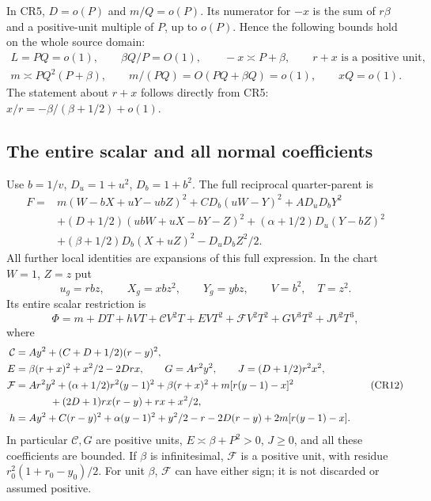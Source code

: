 In CR5, $D=o(P)$ and $m/Q=o(P)$. Its numerator for $-x$ is
the sum of $r\beta$ and a positive-unit multiple of $P$, up to
$o(P)$. Hence the following bounds hold on the whole source domain:
\[
\begin{gathered}
 L=PQ=o(1),\qquad \beta Q/P=O(1),\qquad
 -x\asymp P+\beta,\qquad r+x\text{ is a positive unit},\\
 m\asymp PQ^2(P+\beta),\qquad
 m/(PQ)=O(PQ+\beta Q)=o(1),\qquad xQ=o(1).
\end{gathered}\tag{CR8}
\]
The statement about $r+x$ follows directly from CR5:
$x/r=-\beta/(\beta+1/2)+o(1)$.

\subsection{The entire scalar and all normal coefficients}

Use $b=1/v$, $D_u=1+u^2$, $D_b=1+b^2$. The full reciprocal
quarter-parent is
\[
\begin{aligned}
 F={}&m(W-bX+uY-ubZ)^2+CD_b(uW-Y)^2+AD_uD_bY^2\\
 &+(D+1/2)(ubW+uX-bY-Z)^2
 +(\alpha+1/2)D_u(Y-bZ)^2\\
 &+(\beta+1/2)D_b(X+uZ)^2-D_uD_bZ^2/2.
\end{aligned}\tag{CR9}
\]
All further local identities are expansions of this full expression.
In the chart $W=1$, $Z=z$ put
\[
 u_g=rbz,\qquad X_g=xbz^2,\qquad Y_g=ybz,
 \qquad V=b^2,\quad T=z^2.
 \tag{CR10}
\]
Its entire scalar restriction is
\[
 \Phi=m+DT+hVT+\mathcal C V^2T+EVT^2+
 \mathcal F V^2T^2+GV^3T^2+JV^2T^3,
 \tag{CR11}
\]
where
\[
\begin{aligned}
 \mathcal C&=Ay^2+(C+D+1/2)(r-y)^2,\\
 E&=\beta(r+x)^2+x^2/2-2Drx,\qquad
 G=Ar^2y^2,\qquad J=(D+1/2)r^2x^2,\\
 \mathcal F&=Ar^2y^2+(\alpha+1/2)r^2(y-1)^2
       +\beta(r+x)^2+m[r(y-1)-x]^2\\
 &\hspace{12mm}+(2D+1)rx(r-y)+rx+x^2/2,\\
 h&=Ay^2+C(r-y)^2+\alpha(y-1)^2+y^2/2-r
          -2D(r-y)+2m[r(y-1)-x].
\end{aligned}\tag{CR12}
\]
In particular $\mathcal C,G$ are positive units,
$E\asymp\beta+P^2>0$, $J\geq0$, and all these coefficients
are bounded. If $\beta$ is infinitesimal, $\mathcal F$ is a
positive unit, with residue $r_0^2(1+r_0-y_0)/2$.
For unit $\beta$, $\mathcal F$ can have either sign; it is not
discarded or assumed positive.

